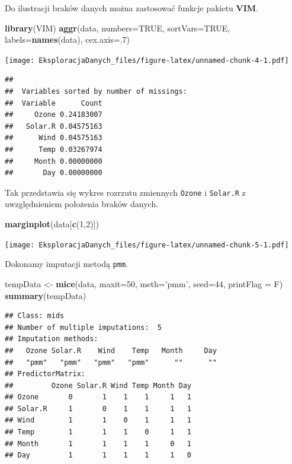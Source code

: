 \documentclass[]{book}
\newenvironment{Shaded}{\begin{snugshade}}{\end{snugshade}}
\newcommand{\DataTypeTok}[1]{\textcolor[rgb]{0.13,0.29,0.53}{#1}}
\newcommand{\DecValTok}[1]{\textcolor[rgb]{0.00,0.00,0.81}{#1}}
\newcommand{\KeywordTok}[1]{\textcolor[rgb]{0.13,0.29,0.53}{\textbf{#1}}}
\newcommand{\NormalTok}[1]{#1}
\newcommand{\OtherTok}[1]{\textcolor[rgb]{0.56,0.35,0.01}{#1}}
\newcommand{\StringTok}[1]{\textcolor[rgb]{0.31,0.60,0.02}{#1}}
\theoremstyle{plain}
\theoremstyle{definition}
\begin{document}
Do ilustracji braków danych można zastosować funkcje pakietu \textbf{VIM}.

\begin{Shaded}
\begin{Highlighting}[]
\KeywordTok{library}\NormalTok{(VIM)}
\KeywordTok{aggr}\NormalTok{(data, }\DataTypeTok{numbers=}\OtherTok{TRUE}\NormalTok{, }
     \DataTypeTok{sortVars=}\OtherTok{TRUE}\NormalTok{, }
     \DataTypeTok{labels=}\KeywordTok{names}\NormalTok{(data), }
     \DataTypeTok{cex.axis=}\NormalTok{.}\DecValTok{7}\NormalTok{)}
\end{Highlighting}
\end{Shaded}

\texttt{[image: EksploracjaDanych\_files/figure-latex/unnamed-chunk-4-1.pdf]}

\begin{verbatim}
## 
##  Variables sorted by number of missings: 
##  Variable      Count
##     Ozone 0.24183007
##   Solar.R 0.04575163
##      Wind 0.04575163
##      Temp 0.03267974
##     Month 0.00000000
##       Day 0.00000000
\end{verbatim}

Tak przedstawia się wykres rozrzutu zmiennych \texttt{Ozone} i \texttt{Solar.R} z uwzględnieniem położenia braków danych.

\begin{Shaded}
\begin{Highlighting}[]
\KeywordTok{marginplot}\NormalTok{(data[}\KeywordTok{c}\NormalTok{(}\DecValTok{1}\NormalTok{,}\DecValTok{2}\NormalTok{)])}
\end{Highlighting}
\end{Shaded}

\texttt{[image: EksploracjaDanych\_files/figure-latex/unnamed-chunk-5-1.pdf]}

Dokonamy imputacji metodą \texttt{pmm}.

\begin{Shaded}
\begin{Highlighting}[]
\NormalTok{tempData <-}\StringTok{ }\KeywordTok{mice}\NormalTok{(data, }
                 \DataTypeTok{maxit=}\DecValTok{50}\NormalTok{, }
                 \DataTypeTok{meth=}\StringTok{'pmm'}\NormalTok{, }
                 \DataTypeTok{seed=}\DecValTok{44}\NormalTok{, }
                 \DataTypeTok{printFlag =}\NormalTok{ F)}
\KeywordTok{summary}\NormalTok{(tempData)}
\end{Highlighting}
\end{Shaded}

\begin{verbatim}
## Class: mids
## Number of multiple imputations:  5 
## Imputation methods:
##   Ozone Solar.R    Wind    Temp   Month     Day 
##   "pmm"   "pmm"   "pmm"   "pmm"      ""      "" 
## PredictorMatrix:
##         Ozone Solar.R Wind Temp Month Day
## Ozone       0       1    1    1     1   1
## Solar.R     1       0    1    1     1   1
## Wind        1       1    0    1     1   1
## Temp        1       1    1    0     1   1
## Month       1       1    1    1     0   1
## Day         1       1    1    1     1   0
\end{verbatim}
\end{document}
